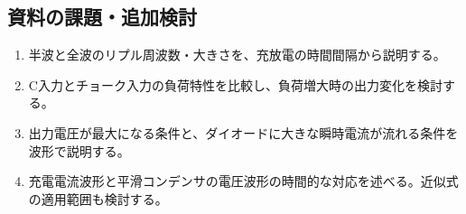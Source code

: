 \documentclass[lualatex,a4paper,10pt]{jlreq}
\begin{document}
\subsection{資料の課題・追加検討}
\begin{enumerate}
\item 半波と全波のリプル周波数・大きさを、充放電の時間間隔から説明する。
\item C入力とチョーク入力の負荷特性を比較し、負荷増大時の出力変化を検討する。
\item 出力電圧が最大になる条件と、ダイオードに大きな瞬時電流が流れる条件を波形で説明する。
\item 充電電流波形と平滑コンデンサの電圧波形の時間的な対応を述べる。近似式の適用範囲も検討する。
\end{enumerate}
\writing{22mm}
\end{document}
